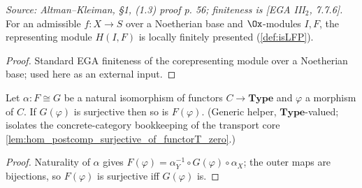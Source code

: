 \begin{theorem}
  \label{thm:ega_H_isLFP}
  \textit{Source: Altman--Kleiman, §1, (1.3) proof p. 56; finiteness is [EGA
  III$_2$, 7.7.6].}
  For an admissible $f : X \to S$ over a Noetherian base and $\Ox$-modules $I, F$,
  the representing module $H(I,F)$ is locally finitely presented (\cref{def:isLFP}).
  \begin{proof}
    Standard EGA finiteness of the corepresenting module over a Noetherian base;
    used here as an external input.
  \end{proof}
\end{theorem}

\begin{lemma}
  \label{lem:surjective_of_natIso_map}
  Let $\alpha : F \cong G$ be a natural isomorphism of functors $C \to \mathbf{Type}$
  and $\varphi$ a morphism of $C$. If $G(\varphi)$ is surjective then so is
  $F(\varphi)$. (Generic helper, $\mathbf{Type}$-valued; isolates the
  concrete-category bookkeeping of the transport core
  \cref{lem:hom_postcomp_surjective_of_functorT_zero}.)
  \begin{proof}
    Naturality of $\alpha$ gives $F(\varphi) = \alpha_{Y}^{-1} \circ G(\varphi)
    \circ \alpha_{X}$; the outer maps are bijections, so $F(\varphi)$ is surjective
    iff $G(\varphi)$ is.
  \end{proof}
\end{lemma}

